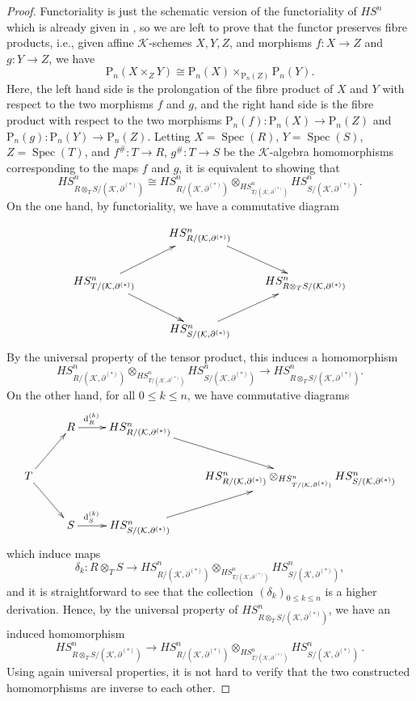 \documentclass[10pt,a4paper]{amsart}
\theoremstyle{plain} %
\theoremstyle{definition}
\theoremstyle{remark}
\newcommand{\cK}{\mathcal{K}}   %
\newcommand{\rP}[1]{\mathrm{P}_{\!#1}}
\newcommand{\Spec}{\operatorname{Spec}}
\newcommand{\hde}[1]{\partial^{(#1)}}  %
\newcommand{\hdiffe}[1]{\operatorname{d}^{(#1)}} %
\numberwithin{equation}{subsection}
\begin{document}
\begin{proof}
    Functoriality is just the schematic version of the functoriality of $HS^n$ which is already given in \cite{er:pda}, so we are left to prove that the functor preserves fibre products, i.e., given affine $\cK$-schemes $X,Y,Z$, and morphisms  $f:X\to Z$ and $g:Y\to Z$,
    we have
    \[   \rP{n}(X\times_Z Y) \cong \rP{n}(X)\times_{\rP{n}(Z)}\rP{n}(Y). \]
    Here, the left hand side is the prolongation of the fibre product of $X$ and $Y$ with respect to the two morphisms $f$ and $g$, and the right hand side is the fibre product with respect to the two morphisms $\rP{n}(f):\rP{n}(X)\to \rP{n}(Z)$ and $\rP{n}(g):\rP{n}(Y)\to\rP{n}(Z)$.
    Letting $X=\Spec(R)$, $Y=\Spec(S)$, $Z=\Spec(T)$, and $f^\#:T\to R$, $g^\#:T\to S$ be the $\cK$-algebra homomorphisms corresponding to the maps $f$ and $g$, it is equivalent to showing that 
    \[  HS^n_{R\otimes_T S/(\cK,\hde{*})} \cong HS^n_{R/(\cK,\hde{*})}\otimes_{HS^n_{T/(\cK,\hde{*})}}HS^n_{S/(\cK,\hde{*})}.\]
    On the one hand, by functoriality, we have a commutative diagram
    
    \[ \xymatrix{ & HS^n_{R/(\cK,\hde{*})} \ar[dr] &\\
    HS^n_{T/(\cK,\hde{*})} \ar[ur] \ar[dr] & & HS^n_{R\otimes_T S/(\cK,\hde{*})}\\
     &  HS^n_{S/(\cK,\hde{*})} \ar[ur] &    
    }  \]          
    By the universal property of the tensor product, this induces a homomorphism
    \[ HS^n_{R/(\cK,\hde{*})}\otimes_{HS^n_{T/(\cK,\hde{*})}}HS^n_{S/(\cK,\hde{*})} \to HS^n_{R\otimes_T S/(\cK,\hde{*})}. \]
    On the other hand, for all $0\leq k\leq n$, we have commutative diagrams 
    \[ \xymatrix{ & R \ar[r]^(.3){\hdiffe{k}_R} & HS^n_{R/(\cK,\hde{*})} \ar[dr] &\\
    T  \ar[ur] \ar[dr]& & & HS^n_{R/(\cK,\hde{*})}\otimes_{HS^n_{T/(\cK,\hde{*})}}HS^n_{S/(\cK,\hde{*})}\\
     & S \ar[r]^(.3){\hdiffe{k}_S} & HS^n_{S/(\cK,\hde{*})} \ar[ur] &    
    }  \]     
    which induce maps
    \[  \delta_k: R\otimes_T S \to HS^n_{R/(\cK,\hde{*})}\otimes_{HS^n_{T/(\cK,\hde{*})}}HS^n_{S/(\cK,\hde{*})},\]
    and it is straightforward to see that the collection $(\delta_k)_{0\leq k\leq n}$ is a higher derivation. Hence, by the universal property of $HS^n_{R\otimes_T S/(\cK,\hde{*})}$, we have an induced homomorphism
    \[ HS^n_{R\otimes_T S/(\cK,\hde{*})}\to HS^n_{R/(\cK,\hde{*})}\otimes_{HS^n_{T/(\cK,\hde{*})}}HS^n_{S/(\cK,\hde{*})} \,.\]
    Using again universal properties, it is not hard to verify that the two constructed homomorphisms are inverse to each other.
\end{proof}
\end{document}
